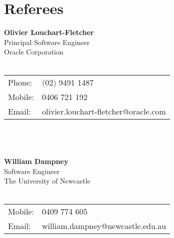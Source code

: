 \documentclass[a4paper]{article}
\begin{document}
\newpage
\ryanHeader

\section*{Referees}
\textbf{Olivier Louchart-Fletcher}\\
Principal Software Engineer\\
Oracle Corporation\\\\
\begin{tabular}{@{}l l}
Phone:&$($02$)$ 9491 1487\\
Mobile:&0406 721 192\\
Email:&olivier.louchart-fletcher@oracle.com\\
\end{tabular}
\\\\\\
\textbf{William Dampney}\\
Software Engineer\\
The University of Newcastle\\\\
\begin{tabular}{@{}l l}
Mobile:&0409 774 605\\
Email:&william.dampney@newcastle.edu.au\\
\end{tabular}
\end{document}
